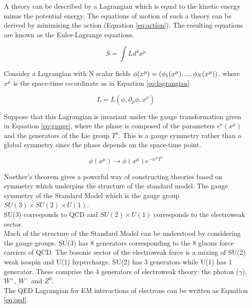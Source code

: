 A theory can be described by a Lagrangian which is equal to the kinetic energy
minus the potential energy. The equations of motion of such a theory can be
derived by minimising the action (Equation \ref{eq:action}). The resulting
equations are known as the Euler-Lagrange equations. 

\begin{equation}
S = \int L d^{4}x^{\mu}
\label{eq:action}
\end{equation}

Consider a Lagrangian with N scalar fields ${\bf \phi}(x^{\mu}) =
\left(\phi_{1}(x^{\mu}),...,\phi_{N}(x^{\mu})\right)$, where $x^{\mu}$ is the
space-time co-ordinate as in Equation \ref{eq:lagrangian}.

\begin{equation}
L = L(\phi, \partial_{\mu}\phi, x^{\mu})
\label{eq:lagrangian}
\end{equation}

Suppose that this Lagrangian is invariant under the gauge transformation given
in Equation \ref{eq:gauge}, where the phase is composed of the parameters 
$\epsilon^{a}\left(x^{\mu}\right)$ and the generators of the Lie group $T^{a}$. 
This is a gauge symmetry rather than a global symmetry since the phase depends 
on the space-time point. 

\begin{equation} 
\phi(x^{\mu})\rightarrow \phi(x^{\mu})e^{-i\epsilon^{a}T^{a}}
\label{eq:gauge}
\end{equation}

Noether's theorem gives a powerful way of constructing theories based on 
symmetry which underpins the structure of the standard model. The gauge
symmetry of the Standard Model which is the gauge group $SU(3)\times 
SU(2)\times U(1)$. \\

SU(3) corresponds to QCD and $SU(2)\times U(1)$ corresponds to the electroweak
sector. \\

Much of the structure of the Standard Model can be understood by considering the
gauge groups. SU(3) has 8 generators corresponding to the 8 gluons force
carriers of QCD. The bosonic sector of the electroweak force is a mixing of
SU(2) weak isospin and U(1) hypercharge. SU(2) has 3 generators while U(1) has 1
generator. These comprise the 4 generators of electroweak theory: the photon
($\gamma$), $W^{+}$, $W^{-}$ and $Z^{0}$. \\

The QED Lagrangian for EM interactions of electrons can be written as Equation 
\ref{eq:qed}.

